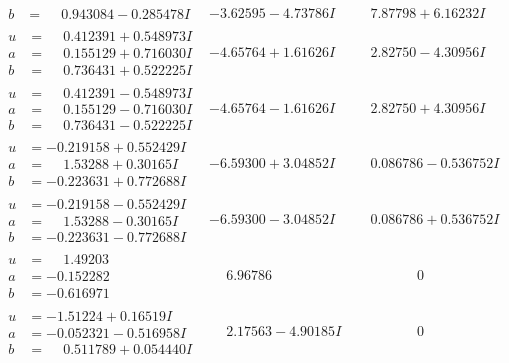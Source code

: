 \documentclass[1p]{elsarticle_modified}
\theoremstyle{definition}
\begin{document}
$$\begin{array}{c|c|c}
\begin{aligned}
b &= \phantom{-}0.943084 - 0.285478 I\end{aligned}
 & -3.62595 - 4.73786 I & \phantom{-}7.87798 + 6.16232 I \\ \hline\begin{aligned}
u &= \phantom{-}0.412391 + 0.548973 I \\
a &= \phantom{-}0.155129 + 0.716030 I \\
b &= \phantom{-}0.736431 + 0.522225 I\end{aligned}
 & -4.65764 + 1.61626 I & \phantom{-}2.82750 - 4.30956 I \\ \hline\begin{aligned}
u &= \phantom{-}0.412391 - 0.548973 I \\
a &= \phantom{-}0.155129 - 0.716030 I \\
b &= \phantom{-}0.736431 - 0.522225 I\end{aligned}
 & -4.65764 - 1.61626 I & \phantom{-}2.82750 + 4.30956 I \\ \hline\begin{aligned}
u &= -0.219158 + 0.552429 I \\
a &= \phantom{-}1.53288 + 0.30165 I \\
b &= -0.223631 + 0.772688 I\end{aligned}
 & -6.59300 + 3.04852 I & \phantom{-}0.086786 - 0.536752 I \\ \hline\begin{aligned}
u &= -0.219158 - 0.552429 I \\
a &= \phantom{-}1.53288 - 0.30165 I \\
b &= -0.223631 - 0.772688 I\end{aligned}
 & -6.59300 - 3.04852 I & \phantom{-}0.086786 + 0.536752 I \\ \hline\begin{aligned}
u &= \phantom{-}1.49203\phantom{ +0.000000I} \\
a &= -0.152282\phantom{ +0.000000I} \\
b &= -0.616971\phantom{ +0.000000I}\end{aligned}
 & \phantom{-}6.96786\phantom{ +0.000000I} & \phantom{-0.000000 } 0 \\ \hline\begin{aligned}
u &= -1.51224 + 0.16519 I \\
a &= -0.052321 - 0.516958 I \\
b &= \phantom{-}0.511789 + 0.054440 I\end{aligned}
 & \phantom{-}2.17563 - 4.90185 I & \phantom{-0.000000 } 0 \\ \hline\begin{aligned}

\end{aligned}
\end{array}$$
\end{document}
